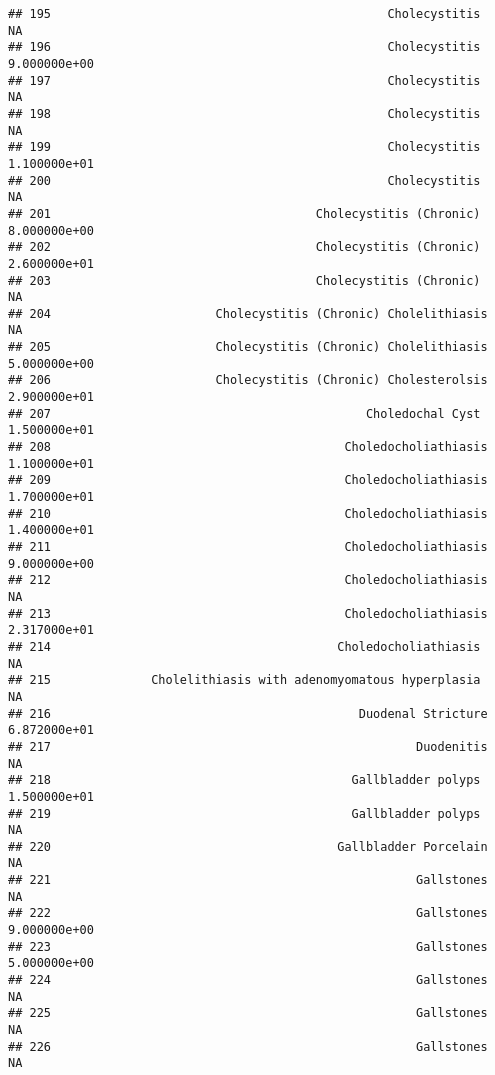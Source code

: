 \documentclass[
]{article}
\begin{document}
\begin{verbatim}
## 195                                               Cholecystitis             NA
## 196                                               Cholecystitis   9.000000e+00
## 197                                               Cholecystitis             NA
## 198                                               Cholecystitis             NA
## 199                                               Cholecystitis   1.100000e+01
## 200                                               Cholecystitis             NA
## 201                                     Cholecystitis (Chronic)   8.000000e+00
## 202                                     Cholecystitis (Chronic)   2.600000e+01
## 203                                     Cholecystitis (Chronic)             NA
## 204                       Cholecystitis (Chronic) Cholelithiasis            NA
## 205                       Cholecystitis (Chronic) Cholelithiasis  5.000000e+00
## 206                       Cholecystitis (Chronic) Cholesterolsis  2.900000e+01
## 207                                            Choledochal Cyst   1.500000e+01
## 208                                         Choledocholiathiasis  1.100000e+01
## 209                                         Choledocholiathiasis  1.700000e+01
## 210                                         Choledocholiathiasis  1.400000e+01
## 211                                         Choledocholiathiasis  9.000000e+00
## 212                                         Choledocholiathiasis            NA
## 213                                         Choledocholiathiasis  2.317000e+01
## 214                                        Choledocholiathiasis             NA
## 215              Cholelithiasis with adenomyomatous hyperplasia             NA
## 216                                           Duodenal Stricture  6.872000e+01
## 217                                                   Duodenitis            NA
## 218                                          Gallbladder polyps   1.500000e+01
## 219                                          Gallbladder polyps             NA
## 220                                        Gallbladder Porcelain            NA
## 221                                                   Gallstones            NA
## 222                                                   Gallstones  9.000000e+00
## 223                                                   Gallstones  5.000000e+00
## 224                                                   Gallstones            NA
## 225                                                   Gallstones            NA
## 226                                                   Gallstones            NA

\end{verbatim}
\end{document}
